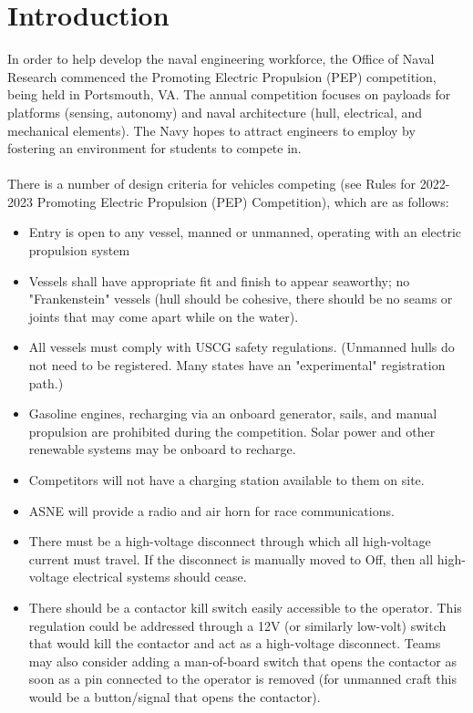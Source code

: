 \documentclass{article}
\begin{document}
\section{Introduction}
In order to help develop the naval engineering workforce, the Office of Naval Research commenced the Promoting Electric Propulsion (PEP) competition, being held in Portsmouth, VA. The annual competition focuses on payloads for platforms (sensing, autonomy) and naval architecture (hull, electrical, and mechanical elements). The Navy hopes to attract engineers to employ by fostering an environment for students to compete in. \\ \\
There is a number of design criteria for vehicles competing (see Rules for 2022-2023 Promoting Electric Propulsion (PEP) Competition), which are as follows: 
    \begin{itemize}
    \item Entry is open to any vessel, manned or unmanned, operating with an electric propulsion system
    \item Vessels shall have appropriate fit and finish to appear seaworthy; no "Frankenstein" vessels (hull should be cohesive, there should be no seams or joints that may come apart while on the water).
    \item All vessels must comply with USCG safety regulations. (Unmanned hulls do not need to be registered. Many states have an "experimental" registration path.)
    \item Gasoline engines, recharging via an onboard generator, sails, and manual propulsion are prohibited during the competition. Solar power and other renewable systems may be onboard to recharge.
    \item Competitors will not have a charging station available to them on site.
    \item ASNE will provide a radio and air horn for race communications. 
    \item There must be a high-voltage disconnect through which all high-voltage current must travel. If the disconnect is manually moved to Off, then all high-voltage electrical systems should cease.
    \item There should be a contactor kill switch easily accessible to the operator. This regulation could be addressed through a 12V (or similarly low-volt) switch that would kill the contactor and act as a high-voltage disconnect. Teams may also consider adding a man-of-board switch that opens the contactor as soon as a pin connected to the operator is removed (for unmanned craft this would be a button/signal that opens the contactor). 

\end{itemize}
\end{document}
